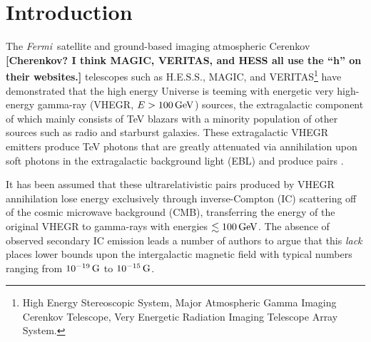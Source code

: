 \documentclass[usenatbib,iop,apj,numberedappendix]{aeb_emulateapj_2015}
\newcommand\ab[1]{{\color{green} \bf #1}} %
\def\eV{{\rm eV}} %
\def\GeV{{\rm G}\eV} %
\def\G{{\rm G}}
\def\Fermi{{\em Fermi\ }}
\begin{document}
\section{Introduction}\label{sec:introduction}






The \Fermi satellite and ground-based imaging atmospheric Cerenkov \ab{[Cherenkov?  I think MAGIC, VERITAS, and HESS all use the ``h'' on their websites.]} telescopes such as
H.E.S.S., MAGIC, and VERITAS\footnote{High Energy
  Stereoscopic System, Major Atmospheric Gamma Imaging Cerenkov Telescope, Very
  Energetic Radiation Imaging Telescope Array System.} have demonstrated that the high
energy Universe is teeming with energetic very high-energy gamma-ray 
(VHEGR, $E > 100\,\GeV$) sources, the extragalactic component of which mainly consists of TeV
blazars with a minority population of other sources  such as radio
and starburst galaxies. These extragalactic VHEGR emitters produce TeV photons that are greatly attenuated via annihilation upon soft photons in the extragalactic background light
(EBL) and produce pairs \citep[see, e.g.,][]{Goul-Schr:67,Sala-Stec:98,Nero-Semi:09}.

It has been assumed that these ultrarelativistic pairs produced by VHEGR annihilation 
lose energy exclusively through inverse-Compton (IC) scattering off of the cosmic microwave
background (CMB),   transferring the energy of the original VHEGR to gamma-rays with
energies $\lesssim100\,\GeV$.  The absence of observed secondary IC emission leads a number of
authors to argue that this \textit{lack} places lower bounds upon the
intergalactic magnetic field
\citep[IGMF; see, e.g.,][]{Nero-Vovk:10,Tave_etal:10a,Tave_etal:10b,Derm_etal:10,Tayl-Vovk-Nero:11,Taka_etal:11,Dola_etal:11} with 
typical numbers ranging from $10^{-19}\,\G$ to $10^{-15}\,\G$.  
\end{document}
